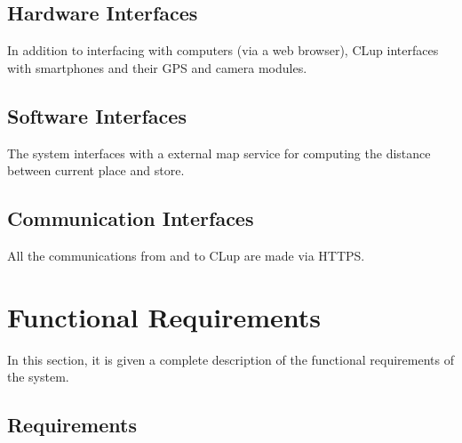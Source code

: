 \clearpage

\subsection{Hardware Interfaces}
In addition to interfacing with computers (via a web browser), CLup interfaces with smartphones and their GPS and camera modules.

\subsection{Software Interfaces}
The system interfaces with a external map service for computing the distance between current place and store.

\subsection{Communication Interfaces}
All the communications from and to CLup are made via HTTPS.

\section{Functional Requirements}
In this section, it is given a complete description of the functional requirements of the system.

    \subsection{Requirements}
